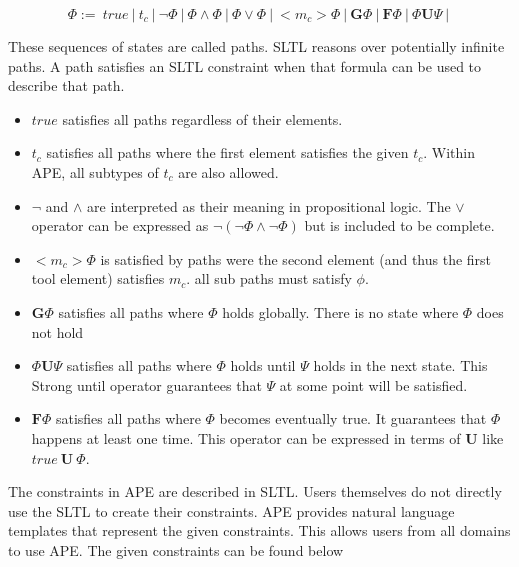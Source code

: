 \documentclass{article}
\begin{document}

\begin{equation}
    \Phi :=\ true\ |\ t_c\ |\ \neg \Phi\ |\ \Phi \wedge \Phi\ |\ \Phi \vee \Phi\ |\ <m_c> \Phi\ |\  \textbf{G} \Phi\ |\ \textbf{F} \Phi\ |\  \Phi \textbf{U} \Psi\ |\  \label{eq:sltl}
\end{equation} 

These sequences of states are called paths. SLTL reasons over potentially infinite paths. A path satisfies an SLTL constraint when that formula can be used to describe that path. 

\begin{itemize}
    \item $true$ satisfies all paths regardless of their elements.
    \item $t_c$ satisfies all paths where the first element satisfies the given $t_c$. Within APE, all subtypes of $t_c$ are also allowed.
    \item $\neg$ and $\wedge$ are interpreted as their meaning in propositional logic. The $\vee$ operator can be expressed as $\neg(\neg \Phi \wedge \neg \Phi)$ but is included to be complete.
    
    \item $<m_c> \Phi$ is satisfied by paths were the second element (and thus the first tool element) satisfies $m_c$. all sub paths must satisfy $\phi$.
    
    \item $\textbf{G}\Phi$ satisfies all paths where $\Phi$ holds globally. There is no state where $\Phi$ does not hold
    \item $\Phi \textbf{U} \Psi$ satisfies all paths where $\Phi$ holds until $\Psi$ holds in the next state. This Strong until operator guarantees that $\Psi$ at some point will be satisfied. 
    \item $\textbf{F}\Phi$ satisfies all paths where $\Phi$ becomes eventually true. It guarantees that $\Phi$ happens at least one time. This operator can be expressed in terms of \textbf{U} like $true\ \textbf{U}\ \Phi$.
    
\end{itemize}

The constraints in APE are described in SLTL. Users themselves do not directly use the SLTL to create their constraints. APE provides natural language templates that represent the given constraints. This allows users from all domains to use APE. The given constraints can be found below\\
\end{document}
